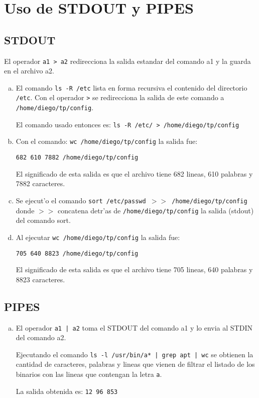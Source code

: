 \section{Uso de STDOUT y PIPES}
\subsection{STDOUT}
El operador \texttt{a1 > a2} redirecciona la salida estandar del comando a1 y la guarda en el archivo a2.

\begin{enumerate}[a)]

\item El comando \texttt{ls -R /etc} lista en forma recursiva el contenido del directorio \texttt{/etc}.
Con el operador \texttt{>} se redirecciona la salida de este comando a \texttt{/home/diego/tp/config}.

El comando usado entonces es: \texttt{ls -R /etc/ > /home/diego/tp/config}

\item Con el comando: \texttt{wc /home/diego/tp/config} la salida fue:

\texttt{682 610 7882 /home/diego/tp/config}

El significado de esta salida es que el archivo tiene 682 lineas, 610 palabras y 7882 caracteres.

\item Se ejecut'o el comando \texttt{sort /etc/passwd $>>$ /home/diego/tp/config} donde \texttt{$>>$} concatena detr'as de \texttt{/home/diego/tp/config} la salida (stdout) del comando sort.

\item Al ejecutar \texttt{wc /home/diego/tp/config} la salida fue:

\texttt{705 640 8823 /home/diego/tp/config}

El significado de esta salida es que el archivo tiene 705 lineas, 640 palabras y 8823 caracteres.
\end{enumerate}

\subsection{PIPES}
\begin{enumerate}[a)]
\item El operador \texttt{a1 | a2} toma el STDOUT del comando a1 y lo envia al STDIN del comando a2.

Ejecutando el comando \texttt{ls -l /usr/bin/a* | grep apt | wc} se obtienen la cantidad de caracteres, palabras y lineas que vienen de filtrar el listado de los binarios con las lineas que contengan la letra \texttt{a}.

La salida obtenida es: \texttt{12 96 853}
\end{enumerate}
